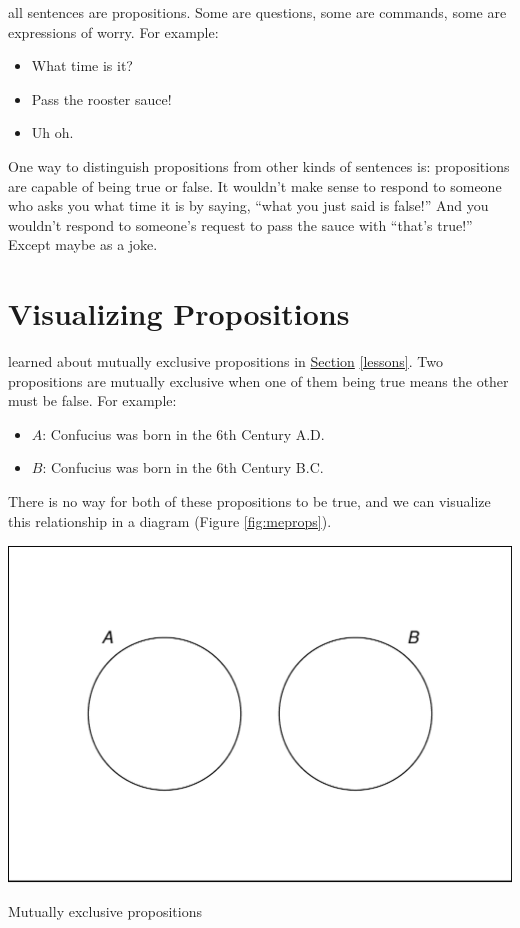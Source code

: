 \documentclass[justified]{tufte-book}
\providecommand{\tightlist}{%
  \setlength{\itemsep}{0pt}\setlength{\parskip}{0pt}}
\theoremstyle{definition}
\theoremstyle{definition}
\theoremstyle{definition}
\theoremstyle{remark}
\begin{document}
 all sentences are propositions. Some are questions,
some are commands, some are expressions of worry. For example:

\begin{itemize}
\tightlist
\item
  What time is it?
\item
  Pass the rooster sauce!
\item
  Uh oh.
\end{itemize}

One way to distinguish propositions from other kinds of sentences is:
propositions are capable of being true or false. It wouldn't make sense
to respond to someone who asks you what time it is by saying, ``what you
just said is false!'' And you wouldn't respond to someone's request to
pass the sauce with ``that's true!'' Except maybe as a joke.

\hypertarget{visualizing-propositions}{%
\section{Visualizing Propositions}\label{visualizing-propositions}}

 learned about mutually exclusive propositions in
\protect\hyperlink{lessons}{Section} \ref{lessons}. Two propositions are
mutually exclusive when one of them being true means the other must be
false. For example:

\begin{itemize}
\tightlist
\item
  \(A\): Confucius was born in the 6th Century A.D.
\item
  \(B\): Confucius was born in the 6th Century B.C.
\end{itemize}

There is no way for both of these propositions to be true, and we can
visualize this relationship in a diagram (Figure \ref{fig:meprops}).

\begin{marginfigure}
\includegraphics{_main_files/figure-latex/meprops-1} \caption[Mutually exclusive propositions]{Mutually exclusive propositions}\label{fig:meprops}
\end{marginfigure}
\end{document}
